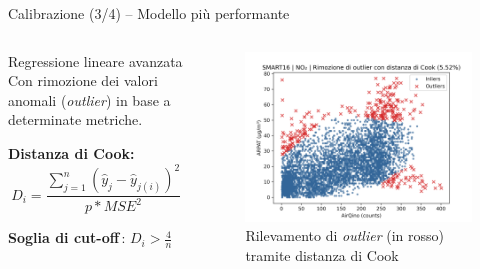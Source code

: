 \begin{frame}{Calibrazione (3/4) – Modello più performante}

\begin{columns}
\hspace{0.3cm}\begin{column}{0.45\textwidth}

\begin{block}{Regressione lineare avanzata}
Con rimozione dei valori anomali (\textit{outlier}) in base a determinate metriche.\vspace{0.2cm}

\textbf{Distanza di Cook\footnotemark:}
$$D_{i}=\frac{\sum_{j=1}^{n}\left(\hat{y}_{j}-\hat{y}_{j(i)}\right)^{2}}{p  * MSE^{2}}$$

\textbf{Soglia di cut-off\,\footnotemark}:
$D_{i}>\frac{4}{n}$

\vspace{0.1cm}
\end{block}
\end{column}

\hspace{0.1cm}\begin{column}{0.55\textwidth}

\begin{center}
\begin{figure}[H]
\centering
\captionsetup{justification=centering}
\includegraphics[width=\textwidth]{images/cook_no2.png}
\caption{Rilevamento di \textit{outlier} (in rosso) tramite distanza di Cook}
\end{figure}
\end{center}

\end{column}

\let\oldfootnotesize\footnotesize
\renewcommand*{\footnotesize}{\oldfootnotesize\tiny}
\addtocounter{footnote}{-1}
\addtocounter{footnote}{1}

\end{columns}

\end{frame}

